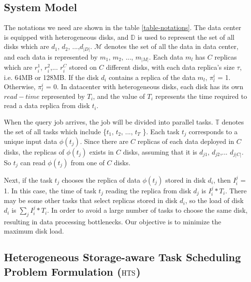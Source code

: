 \documentclass[conference]{IEEEtran}
\begin{document}
\subsection{System Model}

The notations we need are shown in the table \ref{table-notations}. The data center is equipped with heterogeneous disks, and $\mathbb{D}$ is used to represent the set of all disks which are $d_{1}$, $d_{2}$, ...,$d_{|D|}$.  $\mathcal{M}$ denotes the set of all the data in data center, and each data is represented by $m_{1}$, $m_{2}$, ..., $m_{|M|}$. Each data $m_{l}$ has $C$ replicas which are $r_i^1$, $r_i^2$,... $r_i^{C}$ stored on $C$ different disks, with each data replica's size $\tau$, i.e. 64MB or 128MB. If the disk $d_{i}$ contains a replica of the data $m_l$, $\pi_l^{i}$ = 1. Otherwise, $\pi_l^{i}$ = 0. In datacenter with heterogeneous disks, each disk has its own $read-time$ represented by $T_i$, and the value of $T_i$ represents the time required to read a data replica from disk $t_i$.

When the query job arrives, the job will be divided into parallel tasks. $\mathbb{T}$ denotes the set of all tasks which include \{$t_1$, $t_2$, ..., $t_{T}$ \}. Each task $t_j$ corresponds to a unique input data $\phi(t_j)$. Since there are $C$ replicas of each data deployed in $C$ disks, the replicas of $\phi(t_j)$ exists in $C$ disks, assuming that it is $d_{j1}$, $d_{j2}$,... $d_{j|C|}$. So $t_j$ can read $\phi(t_j)$ from one of $C$ disks.

Next, if the task $t_j$ chooses the replica of data $\phi(t_j)$ stored in disk $d_i$, then $I_i^j$ = 1. In this case, the time of task $t_j$ reading the replica from disk $d_{j}$ is $I_i^j*T_i$. There may be some other tasks that select replicas stored in disk $d_{i}$, so the load of disk $d_{i}$ is $\sum_{j}I_i^j*T_i$. In order to avoid a large number of tasks to choose the same disk, resulting in data processing bottlenecks. Our objective is to minimize the maximum disk load.

\subsection{Heterogeneous Storage-aware Task Scheduling Problem Formulation ($\rm{HTS}$)} \label{HTS}

\end{document}

